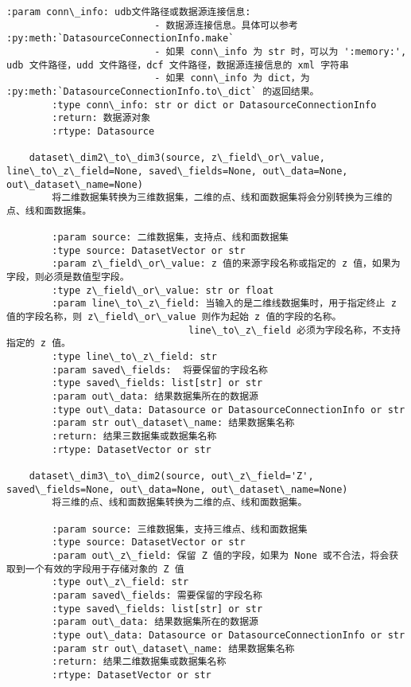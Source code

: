 \documentclass[11pt]{article}
\begin{document}
\begin{Verbatim}[commandchars=\\\{\}]
        :param conn\_info: udb文件路径或数据源连接信息:
                          - 数据源连接信息。具体可以参考 :py:meth:`DatasourceConnectionInfo.make`
                          - 如果 conn\_info 为 str 时，可以为 ':memory:', udb 文件路径，udd 文件路径，dcf 文件路径，数据源连接信息的 xml 字符串
                          - 如果 conn\_info 为 dict，为  :py:meth:`DatasourceConnectionInfo.to\_dict` 的返回结果。
        :type conn\_info: str or dict or DatasourceConnectionInfo
        :return: 数据源对象
        :rtype: Datasource
    
    dataset\_dim2\_to\_dim3(source, z\_field\_or\_value, line\_to\_z\_field=None, saved\_fields=None, out\_data=None, out\_dataset\_name=None)
        将二维数据集转换为三维数据集，二维的点、线和面数据集将会分别转换为三维的点、线和面数据集。
        
        :param source: 二维数据集，支持点、线和面数据集
        :type source: DatasetVector or str
        :param z\_field\_or\_value: z 值的来源字段名称或指定的 z 值，如果为字段，则必须是数值型字段。
        :type z\_field\_or\_value: str or float
        :param line\_to\_z\_field: 当输入的是二维线数据集时，用于指定终止 z 值的字段名称，则 z\_field\_or\_value 则作为起始 z 值的字段的名称。
                                line\_to\_z\_field 必须为字段名称，不支持指定的 z 值。
        :type line\_to\_z\_field: str
        :param saved\_fields:  将要保留的字段名称
        :type saved\_fields: list[str] or str
        :param out\_data: 结果数据集所在的数据源
        :type out\_data: Datasource or DatasourceConnectionInfo or str
        :param str out\_dataset\_name: 结果数据集名称
        :return: 结果三数据集或数据集名称
        :rtype: DatasetVector or str
    
    dataset\_dim3\_to\_dim2(source, out\_z\_field='Z', saved\_fields=None, out\_data=None, out\_dataset\_name=None)
        将三维的点、线和面数据集转换为二维的点、线和面数据集。
        
        :param source: 三维数据集，支持三维点、线和面数据集
        :type source: DatasetVector or str
        :param out\_z\_field: 保留 Z 值的字段，如果为 None 或不合法，将会获取到一个有效的字段用于存储对象的 Z 值
        :type out\_z\_field: str
        :param saved\_fields: 需要保留的字段名称
        :type saved\_fields: list[str] or str
        :param out\_data: 结果数据集所在的数据源
        :type out\_data: Datasource or DatasourceConnectionInfo or str
        :param str out\_dataset\_name: 结果数据集名称
        :return: 结果二维数据集或数据集名称
        :rtype: DatasetVector or str
    

\end{Verbatim}
\end{document}
